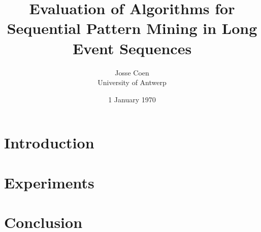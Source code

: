 \documentclass{scrartcl}
\theoremstyle{definition}
\begin{document}
\frenchspacing

\title{Evaluation of Algorithms for Sequential Pattern Mining in Long Event Sequences}
\subtitle{}

\author{Josse Coen
\vspace{.3cm}\\
%
University of Antwerp
%
}

\date{1 January 1970}

\maketitle

\section{Introduction}









\section{Experiments}


\section{Conclusion}
\end{document}
